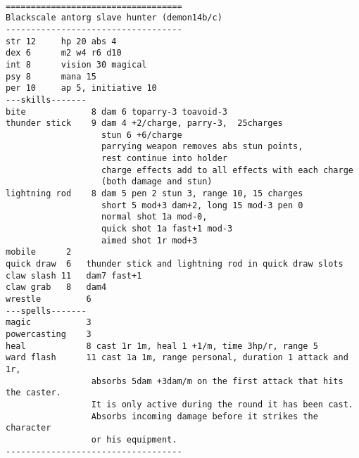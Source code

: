 \

\goodbreak \begin{samepage} \small \begin{verbatim}
===================================
Blackscale antorg slave hunter (demon14b/c)
-----------------------------------
str 12     hp 20 abs 4
dex 6      m2 w4 r6 d10
int 8      vision 30 magical
psy 8      mana 15
per 10     ap 5, initiative 10
---skills-------
bite             8 dam 6 toparry-3 toavoid-3
thunder stick    9 dam 4 +2/charge, parry-3,  25charges
                   stun 6 +6/charge
                   parrying weapon removes abs stun points,
                   rest continue into holder
                   charge effects add to all effects with each charge
                   (both damage and stun)
lightning rod    8 dam 5 pen 2 stun 3, range 10, 15 charges
                   short 5 mod+3 dam+2, long 15 mod-3 pen 0
                   normal shot 1a mod-0,
                   quick shot 1a fast+1 mod-3
                   aimed shot 1r mod+3
mobile      2
quick draw	6	thunder stick and lightning rod in quick draw slots
claw slash 11   dam7 fast+1
claw grab	8   dam4
wrestle	        6
---spells-------
magic           3
powercasting    3
heal            8 cast 1r 1m, heal 1 +1/m, time 3hp/r, range 5
ward flash      11 cast 1a 1m, range personal, duration 1 attack and 1r,
                 absorbs 5dam +3dam/m on the first attack that hits the caster.
                 It is only active during the round it has been cast.
                 Absorbs incoming damage before it strikes the character
                 or his equipment.
-----------------------------------
\end{verbatim} \normalsize \end{samepage}










%
